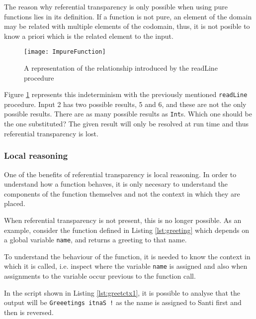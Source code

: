 \documentclass[../main.tex]{subfiles}
\begin{document}
The reason why referential transparency is only possible when using pure
functions lies in its definition. If a function is not pure, an element of the
domain may be related with multiple elements of the codomain, thus, it is not
posible to know a priori which is the related element to the input.

\begin{figure}[ht]
  \centering \texttt{[image: ImpureFunction]}
  \caption{\label{fig:impurefunction} A representation of the relationship introduced
    by the readLine procedure}
\end{figure}

Figure \ref{fig:impurefunction} represents this indeterminism with the
previously mentioned \texttt{readLine} procedure. Input 2
has two possible results, 5 and 6, and these are not the only possible results.
There are as many possible results as \texttt{Int}s. Which one should be the one substituted? The
given result will only be resolved at run time and thus referential transparency
is lost.

\subsubsection{Local reasoning} One of the benefits of referential transparency
is local reasoning. In order to understand how a function behaves, it is only
necesary to understand the components of the function themselves and not the context
in which they are placed.

When referential transparency is not present, this is no longer possible. As an
example, consider the function defined in Listing \ref{lst:greeting} which
depends on a global variable \texttt{name}, and returns a greeting to that name.



To understand the behaviour of the function, it is needed to know the context in
which it is called, i.e. inspect where the variable \texttt{name} is assigned
and also when assignments to the variable occur previous to the function call.

In the script shown in Listing \ref{lst:greetctx1}, it is possible to analyse
that the output will be \texttt{Greeetings itnaS !} as the name is assigned
to Santi first and then is reversed.


\end{document}
